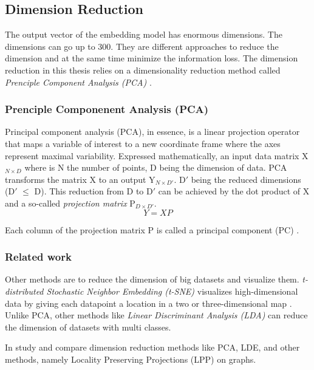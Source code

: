 \subsection{Dimension Reduction}
\label{subsec:dimension-reduction}
The output vector of the embedding model has enormous dimensions. The dimensions can go up to 300. They are different approaches to reduce the dimension and at the same time minimize the information loss. The dimension reduction in this thesis relies on a dimensionality reduction method called \emph{Prenciple Component Analysis (PCA)} \cite{woldPrincipalComponentAnalysis}.

\subsubsection{Prenciple Componenent Analysis (PCA)}
\label{subsubsec:pca}
Principal component analysis (PCA), in essence, is a linear projection operator that maps a variable of interest to a new coordinate frame where the axes represent maximal variability. Expressed mathematically, an input data matrix X$_{N \times D}$ where is N the number of points, D being the dimension of data. PCA transforms the matrix X to an output Y$_{N \times D\prime}$. D$\prime$ being the reduced dimensions (D$\prime$ $\leq$ D). This reduction from D to D$\prime$ can be achieved by the dot product of X and a so-called \emph{projection matrix} P$_{D \times D\prime}$.
    \begin{equation}
        \label{PCA}
        Y = XP
    \end{equation}

Each column of the projection matrix P is called a principal component (PC) \cite{xu10701MachineLearning}. 


\subsubsection{Related work}
\label{subsubsec:dimension-reduction-related-work}
Other methods are to reduce the dimension of big datasets and visualize them. \emph{t-distributed Stochastic Neighbor Embedding (t-SNE)} visualizes high-dimensional data by giving each datapoint a location in a two or three-dimensional map \cite{vandermaaten08a}. Unlike PCA, other methods like \emph{Linear Discriminant Analysis (LDA)} \cite{balakrishnamaLINEARDISCRIMINANTANALYSIS} can reduce the dimension of datasets with multi classes.


In \cite{yanGraphEmbeddingExtensions2007} study and compare dimension reduction methods like PCA, LDE, and other methods, namely Locality Preserving Projections (LPP) on graphs.


